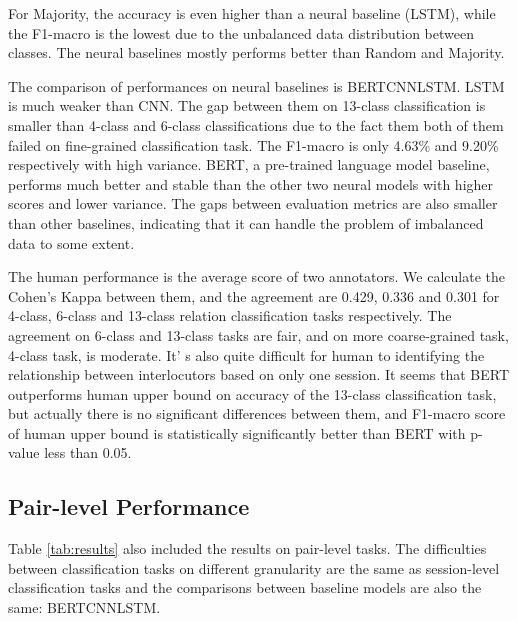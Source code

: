 \documentclass[letterpaper]{article} \usepackage{aaai21}  \usepackage{times}  \usepackage{helvet} \usepackage{courier}  \usepackage[hyphens]{url}  \usepackage{graphicx} \usepackage{xcolor}
\begin{document}
For Majority, the accuracy is even higher than a neural baseline (LSTM), while the F1-macro is the lowest due to the unbalanced data distribution between classes. The neural baselines mostly performs better than Random and Majority.

The comparison of performances on neural baselines is BERTCNNLSTM. LSTM is much weaker than CNN. The gap between them on 13-class classification is smaller than 4-class and 6-class classifications due to the fact them both of them failed on fine-grained classification task. The F1-macro is only 4.63\% and 9.20\% respectively with high variance.
BERT, a pre-trained language model baseline, performs much better and stable than the other two neural models with higher scores and lower variance. The gaps between evaluation metrics are also smaller than other baselines, indicating that it can handle the problem of imbalanced data to some extent.

The human performance is the average score of two annotators. We calculate the Cohen's Kappa between them, and the agreement are 0.429, 0.336 and 0.301 for 4-class, 6-class and 13-class relation classification tasks respectively. The agreement on 6-class and 13-class tasks are fair, and on more coarse-grained task, 4-class task, is moderate. It' s also quite difficult for human to identifying the relationship between interlocutors based on only one session. It seems that BERT outperforms human upper bound on accuracy of the 13-class classification task, but actually there is no significant differences between them, and F1-macro score of human upper bound is statistically significantly better than BERT with p-value less than 0.05.



\subsection{Pair-level Performance}

\label{sec:pair}
Table \ref{tab:results} also included the results on pair-level tasks. The difficulties between classification tasks on different granularity are the same as session-level classification tasks and the comparisons between baseline models are also the same: BERTCNNLSTM. 
\end{document}
